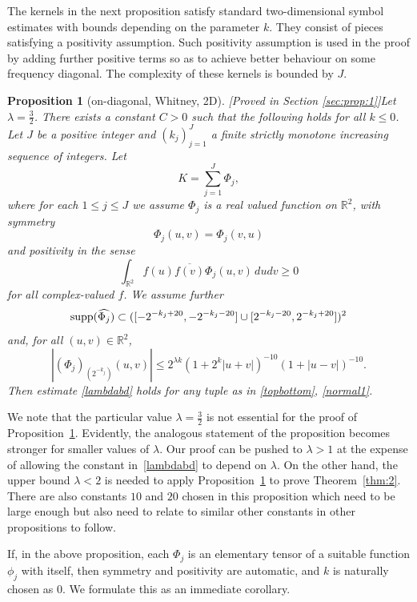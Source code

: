 \documentclass[12pt,reqno]{amsart}
\theoremstyle{plain}
\newtheorem{proposition}[theorem]{Proposition}
\theoremstyle{definition}
\numberwithin{equation}{section}
\newcommand{\R}{{\mathbb R}}
\begin{document}
The kernels in the next proposition satisfy standard two-dimensional symbol estimates with bounds depending on the parameter $k$.
They consist of pieces satisfying a positivity assumption.
Such positivity assumption is used in the proof by adding further
positive terms so as to achieve better behaviour on some frequency diagonal.
The complexity of these kernels is bounded by $J$.

\begin{proposition}[on-diagonal, Whitney, 2D][Proved in Section \ref{sec:prop:1}]\label{prop:1}
Let $\lambda=\frac{3}{2}$.
There exists a constant $C>0$ such that the following holds for all $k \leq 0$. 
Let $J$ be a positive integer and   $(k_j)_{j=1}^J$ 
  a finite strictly monotone increasing sequence of integers.
Let
\[K =\sum_{j=1}^J \Phi_j,\]
where for each $1\le j\le J$ we assume 
$\Phi_j$ is a real valued  function on $\R^2$,
with symmetry $$\Phi_j(u,v)=\Phi_j(v,u)$$ and positivity
in the sense
\begin{equation}\label{poskernel}
\int_{\R^2} f(u)\overline{f(v)}\Phi_j(u,v)\,dudv\ge 0
\end{equation}
for all complex-valued $f$.
We assume further
\begin{equation*}%
{\rm supp} (\widehat{\Phi_j})\subset 
([-2^{-k_j+20},-2^{-k_j-20}]\cup [2^{-k_j-20},2^{-k_j+20}])^2
\end{equation*}  
and, for all $(u,v)\in \R^2$,
\begin{equation}\label{E:phi-lambda}
 |(\Phi_j)_{(2^{-k_j})}(u, v)| \leq  2^{\lambda k}(1+2^k|u+v|)^{-10} (1+|u-v|)^{-10}.
\end{equation}
Then estimate \eqref{lambdabd} holds for any tuple as in \eqref{topbottom}, \eqref{normal1}.
\end{proposition}

We note that the particular value $\lambda=\frac{3}{2}$ is not essential for the proof of Proposition~\ref{prop:1}. Evidently, the analogous statement of the proposition becomes stronger for smaller values of $\lambda$. Our proof can be pushed 
to $\lambda>1$ at the expense of allowing the constant in~\eqref{lambdabd} to depend on $\lambda$. On the other hand, the upper bound $\lambda<2$ is needed to apply Proposition~\ref{prop:1} to prove Theorem~\ref{thm:2}.
There are also constants $10$ and $20$ chosen in this proposition which need to be large enough but
also need to relate to similar other constants in other propositions to follow.


If, in the above proposition, each $\Phi_j$ is an elementary tensor of a
suitable function $\phi_j$ with itself, then symmetry and positivity
are automatic, 
and $k$ is naturally chosen as $0$. 
We formulate this as an immediate corollary.
\end{document}
